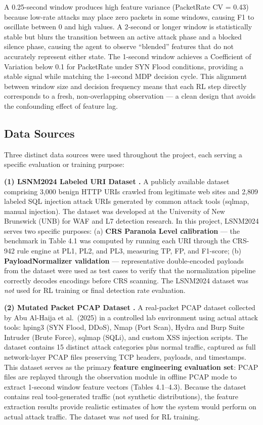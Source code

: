 \documentclass[12pt,a4paper]{report}
\begin{document}
A 0.25-second window produces high feature variance (PacketRate CV = 0.43) because low-rate attacks may place zero packets in some windows, causing F1 to oscillate between 0 and high values. A 2-second or longer window is statistically stable but blurs the transition between an active attack phase and a blocked silence phase, causing the agent to observe ``blended'' features that do not accurately represent either state. The 1-second window achieves a Coefficient of Variation below 0.1 for PacketRate under SYN Flood conditions, providing a stable signal while matching the 1-second MDP decision cycle. This alignment between window size and decision frequency means that each RL step directly corresponds to a fresh, non-overlapping observation --- a clean design that avoids the confounding effect of feature lag.

\subsection{Data Sources}

Three distinct data sources were used throughout the project, each serving a specific evaluation or training purpose:

\textbf{(1) LSNM2024 Labeled URI Dataset \cite{lsnm2024}.} A publicly available dataset comprising 3,000 benign HTTP URIs crawled from legitimate web sites and 2,809 labeled SQL injection attack URIs generated by common attack tools (sqlmap, manual injection). The dataset was developed at the University of New Brunswick (UNB) for WAF and L7 detection research. In this project, LSNM2024 serves two specific purposes: (a) \textbf{CRS Paranoia Level calibration} --- the benchmark in Table 4.1 was computed by running each URI through the CRS-942 rule engine at PL1, PL2, and PL3, measuring TP, FP, and F1-score; (b) \textbf{PayloadNormalizer validation} --- representative double-encoded payloads from the dataset were used as test cases to verify that the normalization pipeline correctly decodes encodings before CRS scanning. The LSNM2024 dataset was \textit{not} used for RL training or final detection rate evaluation.

\textbf{(2) Mutated Packet PCAP Dataset \cite{lsnm2024}.} A real-packet PCAP dataset collected by Abu Al-Haija et al.\ (2025) in a controlled lab environment using actual attack tools: hping3 (SYN Flood, DDoS), Nmap (Port Scan), Hydra and Burp Suite Intruder (Brute Force), sqlmap (SQLi), and custom XSS injection scripts. The dataset contains 15 distinct attack categories plus normal traffic, captured as full network-layer PCAP files preserving TCP headers, payloads, and timestamps. This dataset serves as the primary \textbf{feature engineering evaluation set}: PCAP files are replayed through the observation module in offline PCAP mode to extract 1-second window feature vectors (Tables 4.1--4.3). Because the dataset contains real tool-generated traffic (not synthetic distributions), the feature extraction results provide realistic estimates of how the system would perform on actual attack traffic. The dataset was \textit{not} used for RL training.
\end{document}

